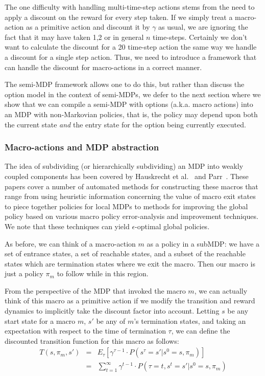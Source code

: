 The one difficulty with handling multi-time-step actions stems from
the need to apply a discount on the reward for every step taken.  If
we simply treat a macro-action as a primitive action and discount it
by $\gamma$ as usual, we are ignoring the fact that it may have taken
1,2 or in general $n$ time-steps.  Certainly we don't want to
calculate the discount for a 20 time-step action the same way we
handle a discount for a single step action.  Thus, we need to
introduce a framework that can handle the discount for macro-actions
in a correct manner.

The semi-MDP framework allows one to do this, but rather than discuss
the option model in the context of semi-MDPs, we defer to the next
section where we show that we can compile a semi-MDP with options
(a.k.a. macro actions) into an MDP with non-Markovian
policies, that is, the policy may depend upon both the current state
\emph{and} the entry state for the option being currently executed.

\subsubsection{Macro-actions and MDP abstraction}

The idea of subdividing (or hierarchically subdividing) an MDP into
weakly coupled components has been covered by Hauskrecht et
al.~\cite{HMKDB} and Parr~\cite{flexible}.  These papers cover a number
of automated methods for constructing these macros that range from
using heuristic information concerning the value of macro exit states
to piece together policies for local MDPs to methods for improving the
global policy based on various macro policy error-analysis and improvement techniques.
We note that these techniques can yield $\epsilon$-optimal global policies.

As before, we can think of a macro-action $m$ as a policy in a subMDP:  we have
a set of entrance states, a set of reachable states, and a subset
of the reachable states which are termination states where we exit
the macro.  Then our macro is just a policy $\pi_m$ to follow while in this
region.  

From the perspective of the MDP that invoked the macro $m$, we can
actually think of this macro as a primitive action if we modify the
transition and reward dynamics to implicitly take the discount factor
into account.  Letting $s$ be any start state for a macro $m$, $s'$ be
any of $m$'s termination states, and taking
an expectation with respect to the time of termination $\tau$, we can
define the discounted transition function for this macro as follows:
\begin{eqnarray*}
T(s,\pi_m,s') & = & E_{\tau} [\gamma^{\tau-1} \cdot P(s^{\tau} = s' | s^0 = s, \pi_m)] \\
              & = & \sum_{t=1}^{\infty} \gamma^{t-1} \cdot P( \tau = t, s^t = s' | s^0 = s, \pi_m) 
\end{eqnarray*}

